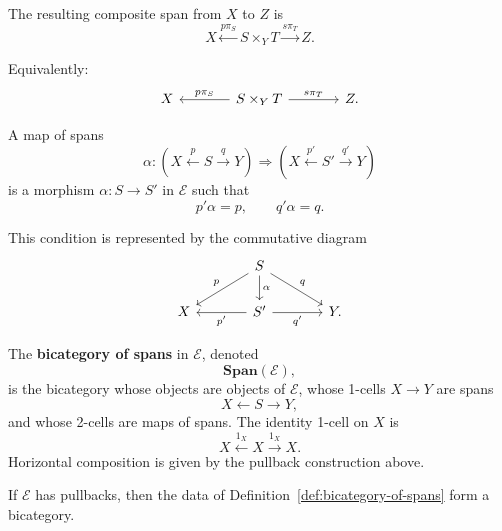 The resulting composite span from \(X\) to \(Z\) is
\[
X
\xleftarrow{p\pi_S}
S\times_Y T
\xrightarrow{s\pi_T}
Z.
\]

Equivalently:
\[
\begin{tikzcd}[column sep=large]
X
&
S\times_Y T
\arrow[l, "p\pi_S"']
\arrow[r, "s\pi_T"]
&
Z.
\end{tikzcd}
\]

A map of spans
\[
\alpha:
\left(
X \xleftarrow{p} S \xrightarrow{q} Y
\right)
\Longrightarrow
\left(
X \xleftarrow{p'} S' \xrightarrow{q'} Y
\right)
\]
is a morphism \(\alpha:S\to S'\) in \(\mathcal E\) such that
\[
p'\alpha=p,
\qquad
q'\alpha=q.
\]

This condition is represented by the commutative diagram
\[
\begin{tikzcd}[column sep=large]
& S \arrow[dl, "p"'] \arrow[dr, "q"] \arrow[d, "\alpha"] & \\
X & S' \arrow[l, "p'"] \arrow[r, "q'"'] & Y.
\end{tikzcd}
\]

\begin{definition}
\label{def:bicategory-of-spans}
The \textbf{bicategory of spans} in \(\mathcal E\), denoted
\[
\mathbf{Span}(\mathcal E),
\]
is the bicategory whose objects are objects of \(\mathcal E\), whose 1-cells \(X\to Y\) are spans
\[
X \xleftarrow{} S \xrightarrow{} Y,
\]
and whose 2-cells are maps of spans. The identity 1-cell on \(X\) is
\[
X \xleftarrow{1_X} X \xrightarrow{1_X} X.
\]
Horizontal composition is given by the pullback construction above.
\end{definition}

\begin{proposition}
\label{prop:span-is-bicategory}
If \(\mathcal E\) has pullbacks, then the data of Definition~\ref{def:bicategory-of-spans} form a bicategory.
\end{proposition}


